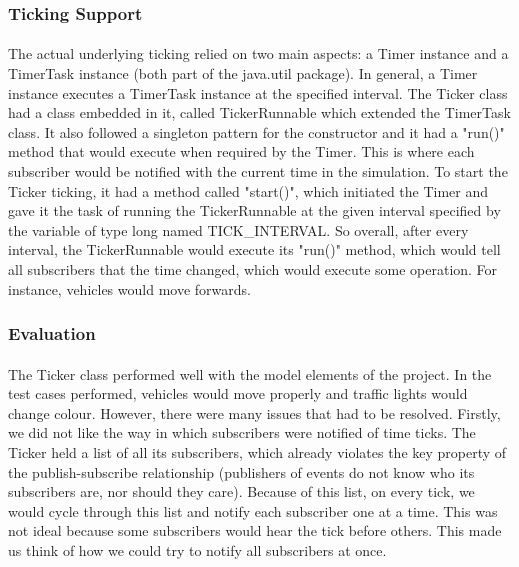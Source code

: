 \documentclass[a4paper,11pt,titlepage]{article}
\begin{document}
\subsubsection{Ticking Support}
\paragraph{}
The actual underlying ticking relied on two main aspects: a Timer instance and a TimerTask instance (both part of the java.util package). In general, a Timer instance executes a TimerTask instance at the specified interval. The Ticker class had a class embedded in it, called TickerRunnable which extended the TimerTask class. It also followed a singleton pattern for the constructor and it had a "run()" method that would execute when required by the Timer. This is where each subscriber would be notified with the current time in the simulation. To start the Ticker ticking, it had a method called "start()", which initiated the Timer and gave it the task of running the TickerRunnable at the given interval specified by the variable of type long named TICK\_INTERVAL. So overall, after every interval, the TickerRunnable would execute its "run()" method, which would tell all subscribers that the time changed, which would execute some operation. For instance, vehicles would move forwards.
\subsubsection{Evaluation}
\paragraph{}
The Ticker class performed well with the model elements of the project. In the test cases performed, vehicles would move properly and traffic lights would change colour. However, there were many issues that had to be resolved. Firstly, we did not like the way in which subscribers were notified of time ticks. The Ticker held a list of all its subscribers, which already violates the key property of the publish-subscribe relationship (publishers of events do not know who its subscribers are, nor should they care). Because of this list, on every tick, we would cycle through this list and notify each subscriber one at a time. This was not ideal because some subscribers would hear the tick before others. This made us think of how we could try to notify all subscribers at once.
\end{document}
